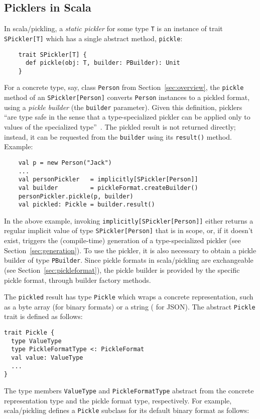 \subsection{Picklers in Scala}\label{sub:picklers-scala}

In scala/pickling, a {\em static pickler} for some type \verb|T| is an
instance of trait \verb|SPickler[T]| which has a single abstract method,
\verb|pickle|:

\begin{lstlisting}
    trait SPickler[T] {
      def pickle(obj: T, builder: PBuilder): Unit
    }
\end{lstlisting}
\noindent
For a concrete type, say, class \verb|Person| from Section~\ref{sec:overview},
the \verb|pickle| method of an \verb|SPickler[Person]| converts
\verb|Person| instances to a pickled format, using a {\em pickle builder} (the
\verb|builder| parameter). Given this definition, picklers ``are type safe in
the sense that a type-specialized pickler can be applied only to values of the
specialized type''~\cite{Elsman2005}. The pickled result is not returned
directly; instead, it can be requested from the \verb|builder| using its
\verb|result()| method. Example:

\begin{lstlisting}
    val p = new Person("Jack")
    ...
    val personPickler   = implicitly[SPickler[Person]]
    val builder         = pickleFormat.createBuilder()
    personPickler.pickle(p, builder)
    val pickled: Pickle = builder.result()
\end{lstlisting}
\noindent
In the above example, invoking \verb|implicitly[SPickler[Person]]| either
returns a regular implicit value of type \verb|SPickler[Person]| that is in
scope, or, if it doesn't exist, triggers the (compile-time) generation of a
type-specialized pickler (see Section~\ref{sec:generation}). To use the
pickler, it is also necessary to obtain a pickle builder of type \verb|PBuilder|. Since pickle formats
in scala/pickling are exchangeable (see Section~\ref{sec:pickleformat}), the pickle
builder is provided by the specific pickle format, through builder factory
methods.

The \verb|pickled| result has type \verb|Pickle| which wraps a concrete
representation, such as a byte array (\eg for binary formats) or a string (\eg
for JSON). The abstract \verb|Pickle| trait is defined as follows:

\begin{lstlisting}
trait Pickle {
  type ValueType
  type PickleFormatType <: PickleFormat
  val value: ValueType
  ...
}
\end{lstlisting}
\noindent
The type members \verb|ValueType| and \verb|PickleFormatType| abstract from
the concrete representation type and the pickle format type, respectively.
For example, scala/pickling defines a \verb|Pickle| subclass for its default binary format
as follows:

